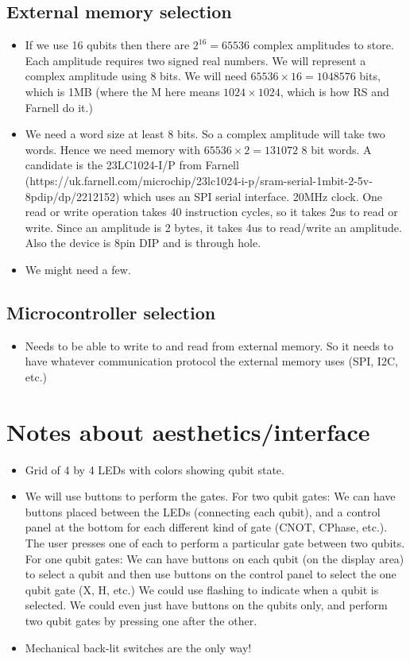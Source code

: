 \documentclass{article}
\begin{document}
\subsection{External memory selection}

\begin{itemize}
\item If we use 16 qubits then there are $2^{16} = 65536$ complex amplitudes to store. Each amplitude requires two signed real numbers. We will represent a complex amplitude using 8 bits. We will need $65536 \times 16 = 1048576$ bits, which is 1MB (where the M here means $1024 \times 1024$, which is how RS and Farnell do it.)
\item We need a word size at least 8 bits. So a complex amplitude will take two words. Hence we need memory with $65536 \times 2 = 131072$ 8 bit words. A candidate is the 23LC1024-I/P from Farnell (https://uk.farnell.com/microchip/23lc1024-i-p/sram-serial-1mbit-2-5v-8pdip/dp/2212152) which uses an SPI serial interface. 20MHz clock. One read or write operation takes 40 instruction cycles, so it takes 2us to read or write. Since an amplitude is 2 bytes, it takes 4us to read/write an amplitude. Also the device is 8pin DIP and is through hole.
\item We might need a few.
\end{itemize}


\subsection{Microcontroller selection}

\begin{itemize}
\item Needs to be able to write to and read from external memory. So it needs to have whatever communication protocol the external memory uses (SPI, I2C, etc.)
\end{itemize}

\section{Notes about aesthetics/interface}
\begin{itemize}
\item Grid of 4 by 4 LEDs with colors showing qubit state.
\item We will use buttons to perform the gates. For two qubit gates: We can have buttons placed between the LEDs (connecting each qubit), and a control panel at the bottom for each different kind of gate (CNOT, CPhase, etc.). The user presses one of each to perform a particular gate between two qubits. For one qubit gates: We can have buttons on each qubit (on the display area) to select a qubit and then use buttons on the control panel to select the one qubit gate (X, H, etc.) We could use flashing to indicate when a qubit is selected. We could even just have buttons on the qubits only, and perform two qubit gates by pressing one after the other.
\item Mechanical back-lit switches are the only way!
\end{itemize}
\end{document}

